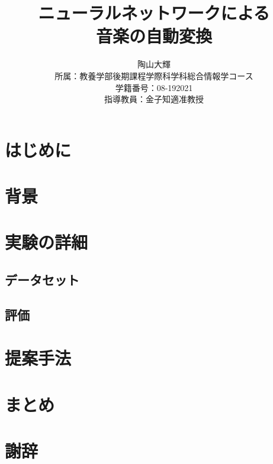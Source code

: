 \documentclass[dvipdfmx]{jreport}
\title{ニューラルネットワークによる\\
音楽の自動変換}
\author{陶山大輝 \\
所属：教養学部後期課程学際科学科総合情報学コース\\
学籍番号：08-192021\\
指導教員：金子知適准教授\\}
\begin{document}
\maketitle


\begin{abstract}

\end{abstract}

\tableofcontents


\chapter{はじめに}


\chapter{背景}


\chapter{実験の詳細}
\section{データセット}

\section{評価}


\chapter{提案手法}


\chapter{まとめ}


\chapter*{謝辞}




\end{document}
